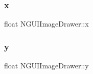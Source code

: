 \subsubsection{\texorpdfstring{x}{x}}
{\footnotesize\ttfamily float N\+G\+U\+I\+Image\+Drawer\+::x}

\hypertarget{class_n_g_u_i_image_drawer_a5848b66155356ddc82e9d3b7f24bb7dc}{}\label{class_n_g_u_i_image_drawer_a5848b66155356ddc82e9d3b7f24bb7dc} 
\subsubsection{\texorpdfstring{y}{y}}
{\footnotesize\ttfamily float N\+G\+U\+I\+Image\+Drawer\+::y}

